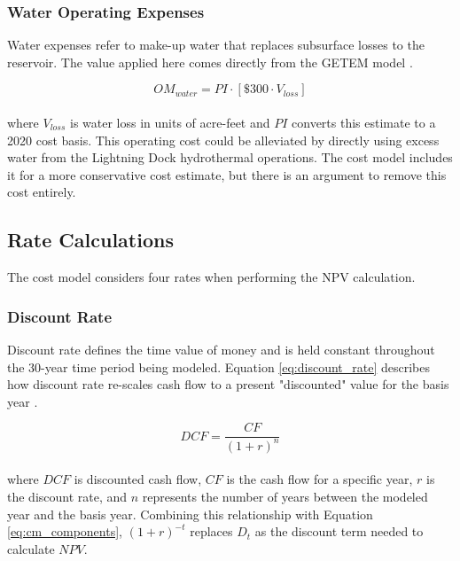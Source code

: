 \subsubsection{Water Operating Expenses}
\label{ch4:cm_opex_water}

Water expenses refer to make-up water that replaces subsurface losses to the reservoir. The value applied here comes directly from the GETEM model \citep{eere_getem_2012}.

\begin{equation}
\label{eq:cm_om_water}
    OM_{water} = PI \cdot \left[\$300 \cdot V_{loss}\right]
\end{equation}
\\
where $V_{loss}$ is water loss in units of acre-feet and $PI$ converts this estimate to a 2020 cost basis. This operating cost could be alleviated by directly using excess water from the Lightning Dock hydrothermal operations. The cost model includes it for a more conservative cost estimate, but there is an argument to remove this cost entirely.

\subsection{Rate Calculations}
\label{ch4:cm_rate_calcs}

The cost model considers four rates when performing the NPV calculation.

\subsubsection{Discount Rate}
\label{ch4:discount_rate}

Discount rate defines the time value of money and is held constant throughout the 30-year time period being modeled. Equation \ref{eq:discount_rate} describes how discount rate re-scales cash flow to a present "discounted" value for the basis year \citep[p.\ 199]{de_neufville_flexibility_2011}.

\begin{equation}
    \label{eq:discount_rate}
    DCF = \frac{CF}{(1+r)^n}
\end{equation}
\\
where $DCF$ is discounted cash flow, $CF$ is the cash flow for a specific year,  $r$ is the discount rate, and $n$ represents the number of years between the modeled year and the basis year. Combining this relationship with Equation \ref{eq:cm_components}, $(1+r)^{-t}$ replaces $D_t$ as the discount term needed to calculate $NPV$.

